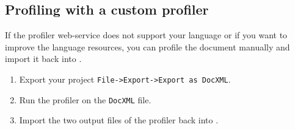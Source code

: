 \subsection{Profiling with a custom profiler}
\begin{frame}
		If the profiler web-service does not support your language or if you want to
		improve the language resources, you can profile the document manually and
		import it back into \pocoto{}.
	\begin{enumerate}
		\item Export your project \texttt{File->Export->Export as DocXML}.
		\item Run the profiler on the \texttt{DocXML} file.
		\item Import the two output files of the profiler back into \pocoto{}.
	\end{enumerate}
\end{frame}


